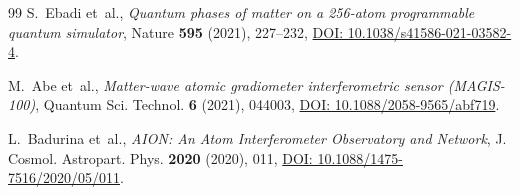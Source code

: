\documentclass[11pt,a4paper,reqno]{amsart}
\theoremstyle{definition}
\numberwithin{equation}{section}
\begin{document}
\begin{thebibliography}{99}
S.~Ebadi et~al.,
\emph{Quantum phases of matter on a 256-atom programmable quantum simulator},
Nature \textbf{595} (2021), 227--232, \href{https://doi.org/10.1038/s41586-021-03582-4}{DOI: 10.1038/s41586-021-03582-4}.

M.~Abe et~al.,
\emph{Matter-wave atomic gradiometer interferometric sensor (MAGIS-100)},
Quantum Sci. Technol. \textbf{6} (2021), 044003, \href{https://doi.org/10.1088/2058-9565/abf719}{DOI: 10.1088/2058-9565/abf719}.

L.~Badurina et~al.,
\emph{AION: An Atom Interferometer Observatory and Network},
J. Cosmol. Astropart. Phys. \textbf{2020} (2020), 011, \href{https://doi.org/10.1088/1475-7516/2020/05/011}{DOI: 10.1088/1475-7516/2020/05/011}.

\end{thebibliography}
\end{document}
